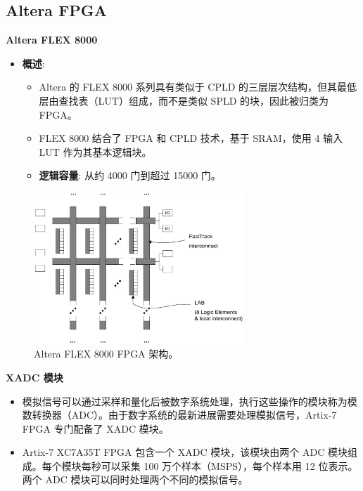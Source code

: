 \subsection{Altera FPGA}
\begin{frame}[allowframebreaks]{\textbf{Altera FLEX 8000}}
\begin{itemize}
\tightlist
\item
    \textbf{概述}:

    \begin{itemize}
    \tightlist
    \item
    Altera 的 FLEX 8000 系列具有类似于 CPLD
    的三层层次结构，但其最低层由查找表（LUT）组成，而不是类似 SPLD
    的块，因此被归类为 FPGA。
    \item
    FLEX 8000 结合了 FPGA 和 CPLD 技术，基于 SRAM，使用 4 输入 LUT
    作为其基本逻辑块。
    \item
    \textbf{逻辑容量}: 从约 4000 门到超过 15000 门。
    \end{itemize}
\end{itemize}

\begin{figure}
    \centering
    \includegraphics[width=0.7\textwidth]{img1/FLEX800.jpeg}
    \caption{Altera FLEX 8000 FPGA 架构。}
\end{figure}

\end{frame}

\begin{frame}{\textbf{XADC 模块}}
\begin{itemize}
\tightlist
\item
    模拟信号可以通过采样和量化后被数字系统处理，执行这些操作的模块称为模数转换器（ADC）。由于数字系统的最新进展需要处理模拟信号，Artix-7
    FPGA 专门配备了 XADC 模块。
\item
    Artix-7 XC7A35T FPGA 包含一个 XADC 模块，该模块由两个 ADC
    模块组成。每个模块每秒可以采集 100 万个样本（MSPS），每个样本用 12
    位表示。两个 ADC 模块可以同时处理两个不同的模拟信号。
\end{itemize}
\end{frame}


